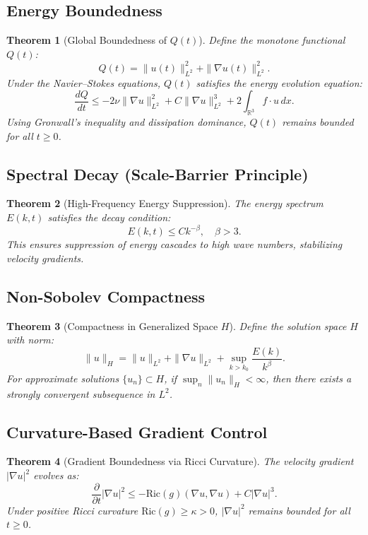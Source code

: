 \documentclass[12pt]{article}
\newtheorem{theorem}{Theorem}
\begin{document}
\subsection{Energy Boundedness}
\begin{theorem}[Global Boundedness of $Q(t)$]
Define the monotone functional $Q(t)$:
\begin{equation}
Q(t) = \|u(t)\|_{L^2}^2 + \|\nabla u(t)\|_{L^2}^2.
\end{equation}
Under the Navier--Stokes equations, $Q(t)$ satisfies the energy evolution equation:
\begin{equation}
\frac{dQ}{dt} \leq -2\nu \|\nabla u\|_{L^2}^2 + C\|\nabla u\|_{L^2}^3 + 2\int_{\mathbb{R}^3} f \cdot u \, dx.
\end{equation}
Using Gronwall's inequality and dissipation dominance, $Q(t)$ remains bounded for all $t \geq 0$.
\end{theorem}

\subsection{Spectral Decay (Scale-Barrier Principle)}
\begin{theorem}[High-Frequency Energy Suppression]
The energy spectrum $E(k, t)$ satisfies the decay condition:
\begin{equation}
E(k, t) \leq Ck^{-\beta}, \quad \beta > 3.
\end{equation}
This ensures suppression of energy cascades to high wave numbers, stabilizing velocity gradients.
\end{theorem}

\subsection{Non-Sobolev Compactness}
\begin{theorem}[Compactness in Generalized Space $H$]
Define the solution space $H$ with norm:
\begin{equation}
\|u\|_H = \|u\|_{L^2} + \|\nabla u\|_{L^2} + \sup_{k > k_0} \frac{E(k)}{k^\beta}.
\end{equation}
For approximate solutions $\{u_n\} \subset H$, if $\sup_n \|u_n\|_H < \infty$, then there exists a strongly convergent subsequence in $L^2$.
\end{theorem}

\subsection{Curvature-Based Gradient Control}
\begin{theorem}[Gradient Boundedness via Ricci Curvature]
The velocity gradient $|\nabla u|^2$ evolves as:
\begin{equation}
\frac{\partial}{\partial t} |\nabla u|^2 \leq -\text{Ric}(g)(\nabla u, \nabla u) + C|\nabla u|^3.
\end{equation}
Under positive Ricci curvature $\text{Ric}(g) \geq \kappa > 0$, $|\nabla u|^2$ remains bounded for all $t \geq 0$.
\end{theorem}
\end{document}
